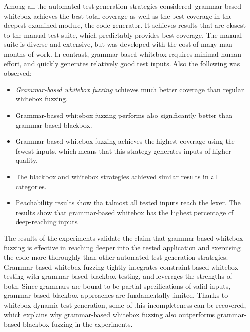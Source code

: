 Among all the automated test generation strategies considered, grammar-based whitebox achieves the best total coverage as well as the best coverage in the deepest examined module, the code generator.
It achieves results that are closest to the manual test suite, which predictably provides best coverage. The manual suite is diverse and extensive, but was developed with the cost of many man-months of work. In contrast, grammar-based whitebox requires minimal human effort, and quickly generates relatively good test inputs.
Also the following was observed:
\begin{itemize}
    \item \textit{Grammar-based whitebox fuzzing} achieves much better coverage than regular whitebox fuzzing.
    \item Grammar-based whitebox fuzzing performs also significantly better than grammar-based blackbox.
    \item Grammar-based whitebox fuzzing achieves the highest coverage using the fewest inputs, which means that this strategy generates inputs of higher quality.
    \item The blackbox and whitebox strategies achieved similar results in all categories.
    \item Reachability results show tha talmost all tested inputs reach the lexer. The results show that grammar-based whitebox has the highest percentage of deep-reaching inputs.
\end{itemize}

The results of the experiments validate the claim that grammar-based whitebox fuzzing is effective in reaching deeper into the tested application and exercising the code more thoroughly than other automated test generation strategies.
Grammar-based whitebox fuzzing tightly integrates constraint-based whitebox testing with grammar-based blackbox testing, and leverages the strengths of both.
Since grammars are bound to be partial specifications of valid inputs, grammar-based blackbox approaches are fundamentally limited. Thanks to whitebox dynamic test generation, some of this incompleteness can be recovered, which explains why grammar-based whitebox fuzzing also outperforms grammar-based blackbox fuzzing in the experiments.